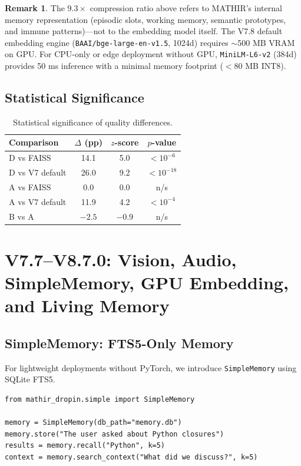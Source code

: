 \documentclass[12pt,a4paper]{article}
\theoremstyle{definition}
\newtheorem{remark}{Remark}[section]
\theoremstyle{remark}
\begin{document}
\begin{remark}
The $9.3\times$ compression ratio above refers to MATHIR's internal memory representation (episodic slots, working memory, semantic prototypes, and immune patterns)---not to the embedding model itself. The V7.8 default embedding engine (\texttt{BAAI/bge-large-en-v1.5}, 1024d) requires $\sim$500 MB VRAM on GPU. For CPU-only or edge deployment without GPU, \texttt{MiniLM-L6-v2} (384d) provides 50 ms inference with a minimal memory footprint ($<$80 MB INT8).
\end{remark}

\subsection{Statistical Significance}

\begin{table}[H]
\centering
\caption{Statistical significance of quality differences.}
\label{tab:stats}
\begin{tabular}{lccc}
\toprule
\textbf{Comparison} & \textbf{$\Delta$ (pp)} & \textbf{$z$-score} & \textbf{$p$-value} \\
\midrule
D vs FAISS & 14.1 & 5.0 & $< 10^{-6}$ \\
D vs V7 default & 26.0 & 9.2 & $< 10^{-18}$ \\
A vs FAISS & 0.0 & 0.0 & n/s \\
A vs V7 default & 11.9 & 4.2 & $< 10^{-4}$ \\
B vs A & $-2.5$ & $-0.9$ & n/s \\
\bottomrule
\end{tabular}
\end{table}

\section{V7.7--V8.7.0: Vision, Audio, SimpleMemory, GPU Embedding, and Living Memory}
\label{sec:v77}

\subsection{SimpleMemory: FTS5-Only Memory}

For lightweight deployments without PyTorch, we introduce \texttt{SimpleMemory} using SQLite FTS5.

\begin{lstlisting}[style=python, caption={SimpleMemory usage.}]
from mathir_dropin.simple import SimpleMemory

memory = SimpleMemory(db_path="memory.db")
memory.store("The user asked about Python closures")
results = memory.recall("Python", k=5)
context = memory.search_context("What did we discuss?", k=5)
\end{lstlisting}
\end{document}
